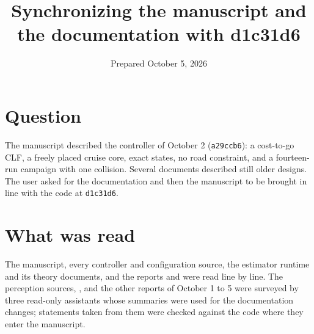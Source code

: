 \documentclass[11pt]{article}
\title{Synchronizing the manuscript and the documentation with d1c31d6}
\date{Prepared October 5, 2026}
\begin{document}
\maketitle

\section{Question}
The manuscript  described the controller of
October 2 (\texttt{a29ccb6}): a cost-to-go CLF, a freely placed cruise core,
exact states, no road constraint, and a fourteen-run campaign with one
collision. Several documents described still older designs. The user asked for
the documentation and then the manuscript to be brought in line with the code
at \texttt{d1c31d6}.

\section{What was read}
The manuscript, every controller and configuration source, the estimator
runtime and its theory documents, and the reports
 and
 were read line by line. The
perception sources, ,  and the other reports of
October 1 to 5 were surveyed by three read-only assistants whose summaries
were used for the documentation changes; statements taken from them were
checked against the code where they enter the manuscript.
\end{document}
